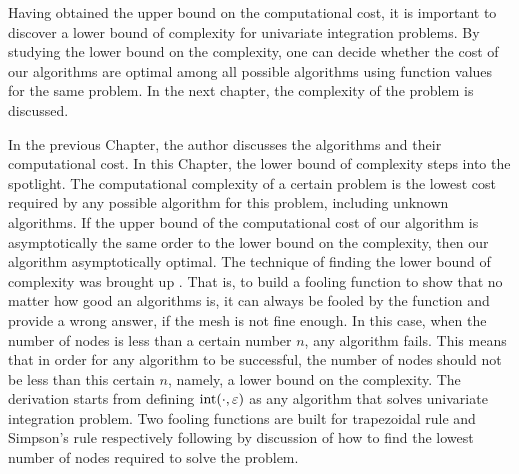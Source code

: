 \documentclass{iitthesis}
\theoremstyle{definition}
\theoremstyle{remark}
\begin{document}
Having obtained the upper bound on the computational cost, it is important to discover a lower bound of complexity for univariate integration problems. By studying the lower bound on the complexity, one can decide whether the cost of our algorithms are optimal among all possible algorithms using function values for the same problem. In the next chapter, the complexity of the problem is discussed.


In the previous Chapter, the author discusses the algorithms and their computational cost. In this Chapter, the lower bound of complexity steps into the spotlight. The computational complexity of a certain problem is the lowest cost required by any possible algorithm for this problem, including unknown algorithms. If the upper bound of the computational cost of our algorithm is asymptotically the same order to the lower bound on the complexity, then our algorithm asymptotically optimal. The technique of finding the lower bound of complexity was brought up \cite[p.\ 11--12]{TraWer98}. That is, to build a fooling function to show that no matter how good an algorithms is, it can always be fooled by the function and provide a wrong answer, if the mesh is not fine enough. In this case, when the number of nodes is less than a certain number $n$, any algorithm fails. This means that in order for any algorithm to be successful, the number of nodes should not be less than this certain $n$, namely, a lower bound on the complexity. The derivation starts from defining $\textup{int}(\cdot,\varepsilon)$ as any algorithm that solves univariate integration problem.  Two fooling functions are built for trapezoidal rule and Simpson's rule respectively following by discussion of how to find the lowest number of nodes required to solve the problem.

\end{document}
